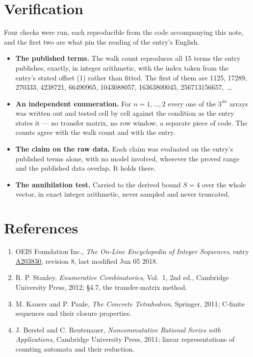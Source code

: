 \documentclass[11pt]{article}
\theoremstyle{definition}
\begin{document}
\section{Verification}

Four checks were run, each reproducible from the code accompanying this note, and the first two are what pin the reading of the entry's English.

\begin{itemize}

\item {\bfseries The published terms.} The walk count reproduces all 15 terms the entry publishes, exactly, in integer arithmetic, with the index taken from the entry's stated offset (1) rather than fitted. The first of them are 1125, 17289, 270333, 4238721, 66490965, 1043088057, 16363800045, 256713156657,~\dots

\item {\bfseries An independent enumeration.} For $n = 1,\dots,2$ every one of the $3^{4n}$ arrays was written out and tested cell by cell against the condition as the entry states it --- no transfer matrix, no row window, a separate piece of code. The counts agree with the walk count and with the entry.

\item {\bfseries The claim on the raw data.} Each claim was evaluated on the entry's published terms alone, with no model involved, wherever the proved range and the published data overlap. It holds there.

\item {\bfseries The annihilation test.} Carried to the derived bound $S = 4$ over the whole vector, in exact integer arithmetic, never sampled and never truncated.

\end{itemize}

\section{References}

\begin{enumerate}

\item OEIS Foundation Inc., \emph{The On-Line Encyclopedia of Integer Sequences}, entry \href{https://oeis.org/A203830}{A203830}, revision 8, last modified Jun 05 2018.

\item R. P. Stanley, \emph{Enumerative Combinatorics}, Vol.~1, 2nd ed., Cambridge University Press, 2012; \S4.7, the transfer-matrix method.

\item M. Kauers and P. Paule, \emph{The Concrete Tetrahedron}, Springer, 2011; C-finite sequences and their closure properties.

\item J. Berstel and C. Reutenauer, \emph{Noncommutative Rational Series with Applications}, Cambridge University Press, 2011; linear representations of counting automata and their reduction.

\end{enumerate}
\end{document}
